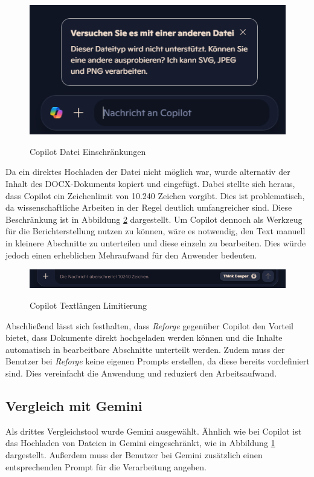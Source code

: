 \begin{figure}[H]
\centering
\includegraphics[width=0.7\linewidth]{Images/Copilot_File.png}\\
\caption{Copilot Datei Einschränkungen}
\label{fig:Copilot_File}
\end{figure}

Da ein direktes Hochladen der Datei nicht möglich war, wurde alternativ der Inhalt des \ac{DOCX}-Dokuments kopiert und eingefügt. Dabei stellte sich heraus, dass Copilot ein Zeichenlimit von 10.240 Zeichen vorgibt. Dies ist problematisch, da wissenschaftliche Arbeiten in der Regel deutlich umfangreicher sind. Diese Beschränkung ist in Abbildung \ref{fig:Copilot_Limit} dargestellt. Um Copilot dennoch als Werkzeug für die Berichterstellung nutzen zu können, wäre es notwendig, den Text manuell in kleinere Abschnitte zu unterteilen und diese einzeln zu bearbeiten. Dies würde jedoch einen erheblichen Mehraufwand für den Anwender bedeuten.  

\begin{figure}[H]
\centering
\includegraphics[width=1\linewidth]{Images/Copilot_Limit.png}\\
\caption{Copilot Textlängen Limitierung}
\label{fig:Copilot_Limit}
\end{figure}

Abschließend lässt sich festhalten, dass \textit{Reforge} gegenüber Copilot den Vorteil bietet, dass Dokumente direkt hochgeladen werden können und die Inhalte automatisch in bearbeitbare Abschnitte unterteilt werden. Zudem muss der Benutzer bei \textit{Reforge} keine eigenen Prompts erstellen, da diese bereits vordefiniert sind. Dies vereinfacht die Anwendung und reduziert den Arbeitsaufwand.

\subsection{Vergleich mit Gemini}
Als drittes Vergleichstool wurde Gemini ausgewählt. Ähnlich wie bei Copilot ist das Hochladen von Dateien in Gemini eingeschränkt, wie in Abbildung \ref{fig:Copilot_File} dargestellt. Außerdem muss der Benutzer bei Gemini zusätzlich einen entsprechenden Prompt für die Verarbeitung angeben.

